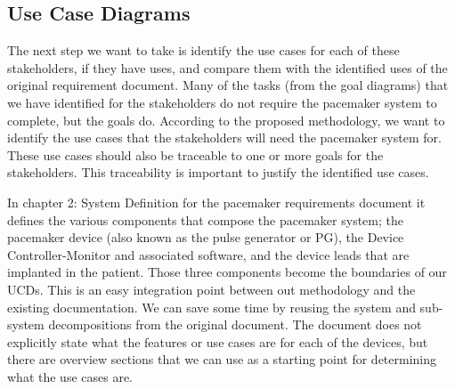 \subsection{Use Case Diagrams}

The next step we want to take is identify the use cases for each of these stakeholders, if they have uses, and compare them with the identified uses of the original requirement document. Many of the tasks (from the goal diagrams) that we have identified for the stakeholders do not require the pacemaker system to complete, but the goals do. According to the proposed methodology, we want to identify the use cases that the stakeholders will need the pacemaker system for. These use cases should also be traceable to one or more goals for the stakeholders. This traceability is important to justify the identified use cases.

In chapter 2: System Definition for the pacemaker requirements document it defines the various components that compose the pacemaker system; the pacemaker device (also known as the pulse generator or PG), the Device Controller-Monitor and associated software, and the device leads that are implanted in the patient. Those three components become the boundaries of our UCDs. This is an easy integration point between out methodology and the existing documentation. We can save some time by reusing the system and sub-system decompositions from the original document. The document does not explicitly state what the features or use cases are for each of the devices, but there are overview sections that we can use as a starting point for determining what the use cases are.

